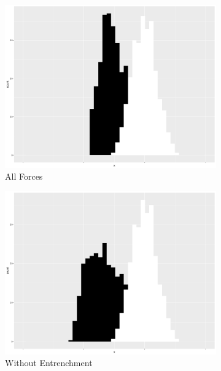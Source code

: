 \begin{figure}[H]
    \begin{subfigure}[t]{.3\textwidth}
        \includegraphics[width=\linewidth]{figures/8000iterwithentrenchment.pdf}
        \caption{\label{fig:Basic-Iterative-Model}All Forces}
    \end{subfigure}\hfill
    \begin{subfigure}[t]{.3\textwidth}
        \includegraphics[width=\linewidth]{figures/8000iternoentrenchment.pdf}
        \caption{\label{fig:NoEntrenchment}Without Entrenchment}
    \end{subfigure}\hfill
    \begin{subfigure}[t]{.3\textwidth}

\end{subfigure}
\end{figure}
